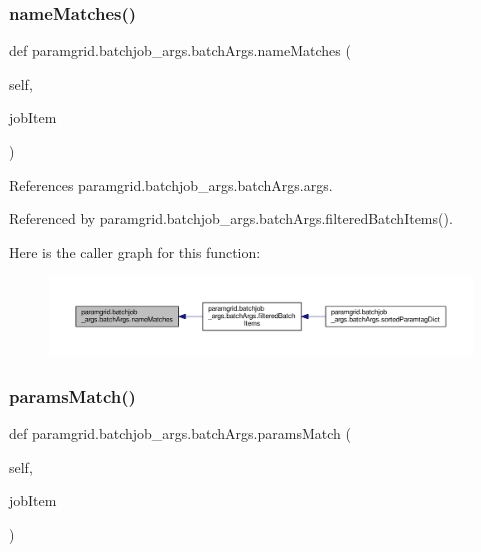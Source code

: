 \subsubsection{\texorpdfstring{name\+Matches()}{nameMatches()}}
{\footnotesize\ttfamily def paramgrid.\+batchjob\+\_\+args.\+batch\+Args.\+name\+Matches (\begin{DoxyParamCaption}\item[{}]{self,  }\item[{}]{job\+Item }\end{DoxyParamCaption})}



References paramgrid.\+batchjob\+\_\+args.\+batch\+Args.\+args.



Referenced by paramgrid.\+batchjob\+\_\+args.\+batch\+Args.\+filtered\+Batch\+Items().

Here is the caller graph for this function\+:
\nopagebreak
\begin{figure}[H]
\begin{center}
\leavevmode
\includegraphics[width=350pt]{classparamgrid_1_1batchjob__args_1_1batchArgs_ae95b522ede37bae834c0aeb9edafebe9_icgraph}
\end{center}
\end{figure}
\mbox{\label{classparamgrid_1_1batchjob__args_1_1batchArgs_a1fb8df013bcf146d0800765b40f9b91d}} 
\subsubsection{\texorpdfstring{params\+Match()}{paramsMatch()}}
{\footnotesize\ttfamily def paramgrid.\+batchjob\+\_\+args.\+batch\+Args.\+params\+Match (\begin{DoxyParamCaption}\item[{}]{self,  }\item[{}]{job\+Item }\end{DoxyParamCaption})}



